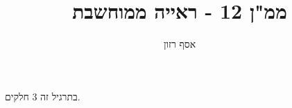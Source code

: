 \documentclass[11pt,a4paper]{article}
\begin{document}
 
\HE 
\title{ממ"ן 12 - ראייה ממוחשבת}
\author{אסף רזון}
\maketitle
בתרגיל זה  3 חלקים. 

\newpage


\EN
\end{document}
